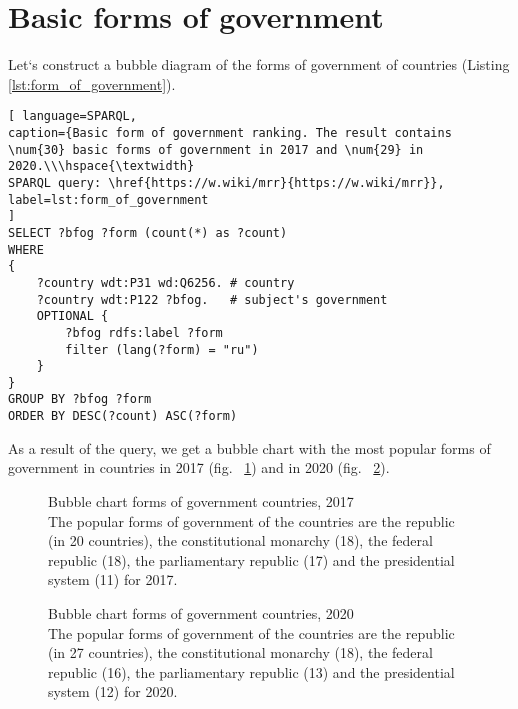 \section{Basic forms of government}

Let`s construct a bubble diagram of the forms of government of countries (Listing \ref{lst:form_of_government}).

\begin{lstlisting}[ language=SPARQL, 
caption={Basic form of government ranking. The result contains \num{30} basic forms of government in 2017 and \num{29} in 2020.\\\hspace{\textwidth}
SPARQL query: \href{https://w.wiki/mrr}{https://w.wiki/mrr}},
label=lst:form_of_government
]
SELECT ?bfog ?form (count(*) as ?count)
WHERE 
{
	?country wdt:P31 wd:Q6256. # country
	?country wdt:P122 ?bfog.   # subject's government
	OPTIONAL {
		?bfog rdfs:label ?form
		filter (lang(?form) = "ru")
	}
}
GROUP BY ?bfog ?form
ORDER BY DESC(?count) ASC(?form)
\end{lstlisting}


As a result of the query, we get a bubble chart with the most popular forms of government in countries in 2017 (fig. ~\ref{fig:bubble_chart_forms_of_government_countries_2017}) and in 2020 (fig. ~\ref{fig:bubble_chart_forms_of_government_countries_2020}).

\begin{figure}
	{
		\setlength{\fboxsep}{0pt}%
		\setlength{\fboxrule}{1pt}%
	}
	\caption{Bubble chart forms of government countries, 2017
		\\ The popular forms of government of the countries are the republic (in 20 countries), the constitutional monarchy (18), the federal republic (18), the parliamentary republic (17) and the presidential system (11) for 2017.
	}%
	\label{fig:bubble_chart_forms_of_government_countries_2017}%
\end{figure}

\begin{figure}
	{
		\setlength{\fboxsep}{0pt}%
		\setlength{\fboxrule}{1pt}%
	}
	\caption{Bubble chart forms of government countries, 2020
		\\ 
		The popular forms of government of the countries are the republic (in 27 countries), the constitutional monarchy (18), the federal republic (16), the parliamentary republic (13) and the presidential system (12) for 2020.
	}%
	\label{fig:bubble_chart_forms_of_government_countries_2020}%
\end{figure}

